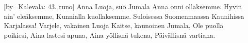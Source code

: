 [by={Kalevala: 43. runo}]
  \beginverse
    Anna Luoja, suo Jumala
    Anna onni ollaksemme.
    Hyvin ain’ eleäksemme,
    Kunnialla kuollaksemme.
    Suloisessa Suomenmaassa
    Kaunihissa Karjalassa!
  \endverse
  \beginverse
    Varjele, vakainen Luoja
    Kaitse, kaunoinen Jumala,
    Ole puolla poikiesi,
    Aina lastesi apuna,
    Aina yöllisnä tukena,
    Päivällisnä vartiana.
  \endverse
\endsong


